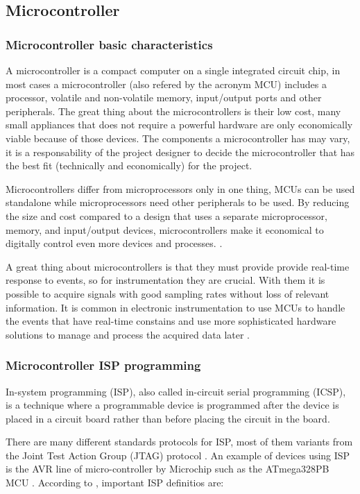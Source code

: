 \subsection{Microcontroller}\label{ssec:mcu-review}

\subsubsection{Microcontroller basic characteristics}\label{sssec:microcontroller-basic-characteristics}

A microcontroller is a compact computer on a single integrated circuit chip, in most cases a microcontroller (also refered by the acronym MCU) includes a processor, volatile and non-volatile memory, input/output ports and other peripherals. The great thing about the microcontrollers is their low cost, many small appliances that does not require a powerful hardware are only economically viable because of those devices. The components a microcontroller has may vary, it is a responsability of the project designer to decide the microcontroller that has the best fit (technically and economically) for the project.
	\par
	Microcontrollers differ from microprocessors only in one thing, MCUs can be used standalone while microprocessors need other peripherals to be used. By reducing the size and cost compared to a design that uses a separate microprocessor, memory, and input/output devices, microcontrollers make it economical to digitally control even more devices and processes. \cite{mcuDef}.
	\par
	A great thing about microcontrollers is that they must provide provide real-time response to events, so for instrumentation they are crucial. With them it is possible to acquire signals with good sampling rates without loss of relevant information. It is common in electronic instrumentation to use MCUs to handle the events that have real-time constains and use more sophisticated hardware solutions to manage and process the acquired data later \cite{bartz2004data}.

\subsubsection{Microcontroller ISP programming}\label{sssec:microcontroller-isp-programming}

	In-system programming (ISP), also called in-circuit serial programming (ICSP), is a technique where a programmable device is programmed after the device is placed in a circuit board \cite{icsp-guide} rather than before placing the circuit in the board.
	\par
	There are many different standards protocols for ISP, most of them variants from the Joint Test Action Group (JTAG) protocol \cite{oshana2002introduction}. An example of devices using ISP is the AVR line of micro-controller by Microchip such as the ATmega328PB MCU \cite{atmega328p-datasheet}. According to \cite{equinox-isp}, important ISP definitios are:

